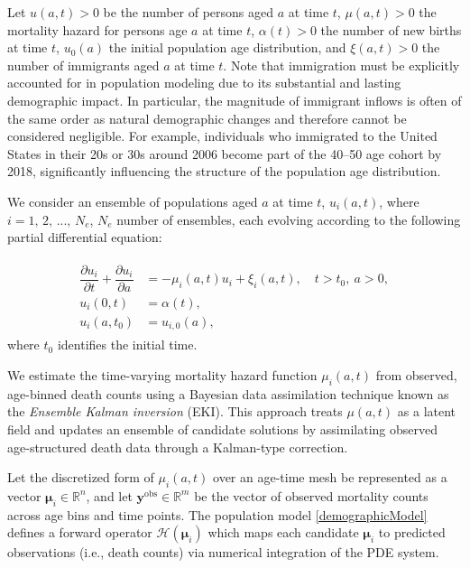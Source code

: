\documentclass{article}
\begin{document}
Let $u(a,t)>0$ be the number of persons aged $a$ at time $t$, $\mu(a,t)>0$ the mortality hazard for persons age $a$ at time $t$, $\alpha(t)>0$ the number of new births at time $t$, $u_0(a)$ the initial population age distribution, and $\xi(a,t)>0$ the number of immigrants aged $a$ at time $t$. Note that immigration must be explicitly accounted for in population modeling due to its substantial and lasting demographic impact. In particular, the magnitude of immigrant inflows is often of the same order as natural demographic changes and therefore cannot be considered negligible. For example, individuals who immigrated to the United States in their 20s or 30s around 2006 become part of the 40–50 age cohort by 2018, significantly influencing the structure of the population age distribution.


We consider an ensemble of populations aged $a$ at time $t$, $u_i(a,t)$, where $i=1,\,2,\,...,\,N_e$, $N_e$ number of ensembles, each evolving according to the following partial differential equation:

\begin{align}\begin{split}\label{demographicModel}
\dfrac{\partial u_i}{\partial t} + \dfrac{\partial u_i}{\partial a} &= -\mu_i(a,t)u_i + \xi_i(a,t), \quad t > t_0,\ a > 0, \\
u_i(0,t) &= \alpha(t), \\
u_i(a,t_0) &= u_{i,0}(a),
\end{split}\end{align}
where $t_0$ identifies the initial time.

We estimate the time-varying mortality hazard function $\mu_i(a,t)$ from observed, age-binned death counts using a Bayesian data assimilation technique known as the \textit{Ensemble Kalman inversion} (EKI). This approach treats $\mu(a,t)$ as a latent field and updates an ensemble of candidate solutions by assimilating observed age-structured death data through a Kalman-type correction. 

Let the discretized form of $\mu_i(a,t)$ over an age-time mesh be represented as a vector $\boldsymbol{\mu}_i \in \mathbb{R}^{n}$, and let $\mathbf{y}^{\text{obs}} \in \mathbb{R}^{m}$ be the vector of observed mortality counts across age bins and time points. The population model \eqref{demographicModel} defines a forward operator $\mathcal{H}(\boldsymbol{\mu}_i)$ which maps each candidate $\boldsymbol{\mu}_i$ to predicted observations (i.e., death counts) via numerical integration of the PDE system.
\end{document}
